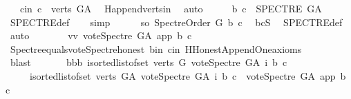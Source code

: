 \begin{isabellebody}
\ \ \ c{\isacharunderscore}{\kern0pt}in{}{\isacharcolon}{\kern0pt}\ {\isachardoublequoteopen}c\ {\isasymin}\ verts\ G{\isacharunderscore}{\kern0pt}A{\isachardoublequoteclose}\ \isamarkupfalse%
\ H{}{\isachardot}{\kern0pt}append{\isacharunderscore}{\kern0pt}verts{\isacharunderscore}{\kern0pt}in\ \isamarkupfalse%
\ auto\isanewline
\ \ \isamarkupfalse%
\ \isamarkupfalse%
\ {\isachardoublequoteopen}{\isacharparenleft}{\kern0pt}b{\isacharcomma}{\kern0pt}\ c{\isacharparenright}{\kern0pt}\ {\isasymin}\ SPECTRE\ G{\isacharunderscore}{\kern0pt}A{\isachardoublequoteclose}\isanewline
\ \ \ \ \isamarkupfalse%
\ SPECTRE{\isacharunderscore}{\kern0pt}def\ \isanewline
\ \ \isamarkupfalse%
{\isacharparenleft}{\kern0pt}simp{\isacharparenright}{\kern0pt}\isanewline
\ \ \ \ \isamarkupfalse%
\ so{\isacharcolon}{\kern0pt}\ {\isachardoublequoteopen}Spectre{\isacharunderscore}{\kern0pt}Order\ G\ b\ c{\isachardoublequoteclose}\ \isamarkupfalse%
\ bcS\ \isamarkupfalse%
\ SPECTRE{\isacharunderscore}{\kern0pt}def\ \isamarkupfalse%
\ auto\isanewline
\ \ \ \ \isamarkupfalse%
\ \isamarkupfalse%
\ vv{\isacharcolon}{\kern0pt}\ {\isachardoublequoteopen}vote{\isacharunderscore}{\kern0pt}Spectre\ G{\isacharunderscore}{\kern0pt}A\ app\ b\ c\ {\isacharequal}{\kern0pt}\ {}{\isachardoublequoteclose}\isanewline
\ \ \ \ \ \ \isamarkupfalse%
\ Spectre{\isacharunderscore}{\kern0pt}equals{\isacharunderscore}{\kern0pt}vote{\isacharunderscore}{\kern0pt}Spectre{\isacharunderscore}{\kern0pt}honest\ b{\isacharunderscore}{\kern0pt}in\ c{\isacharunderscore}{\kern0pt}in\ H{}{\isachardot}{\kern0pt}Honest{\isacharunderscore}{\kern0pt}Append{\isacharunderscore}{\kern0pt}One{\isacharunderscore}{\kern0pt}axioms\isanewline
\ \ \ \ \ \ \isamarkupfalse%
\ blast\ \isanewline
\ \ \ \ \isamarkupfalse%
\ bbb{\isacharcolon}{\kern0pt}\ {\isachardoublequoteopen}{\isacharparenleft}{\kern0pt}{\isasymSum}i{\isasymleftarrow}sorted{\isacharunderscore}{\kern0pt}list{\isacharunderscore}{\kern0pt}of{\isacharunderscore}{\kern0pt}set\ {\isacharparenleft}{\kern0pt}verts\ G{\isacharparenright}{\kern0pt}{\isachardot}{\kern0pt}\ vote{\isacharunderscore}{\kern0pt}Spectre\ G{\isacharunderscore}{\kern0pt}A\ i\ b\ c{\isacharparenright}{\kern0pt}\ {\isacharequal}{\kern0pt}\isanewline
\ \ \ \ \ {\isacharparenleft}{\kern0pt}{\isasymSum}i{\isasymleftarrow}sorted{\isacharunderscore}{\kern0pt}list{\isacharunderscore}{\kern0pt}of{\isacharunderscore}{\kern0pt}set\ {\isacharparenleft}{\kern0pt}verts\ G{\isacharunderscore}{\kern0pt}A{\isacharparenright}{\kern0pt}{\isachardot}{\kern0pt}\ vote{\isacharunderscore}{\kern0pt}Spectre\ G{\isacharunderscore}{\kern0pt}A\ i\ b\ c{\isacharparenright}{\kern0pt}\ {\isacharminus}{\kern0pt}\ vote{\isacharunderscore}{\kern0pt}Spectre\ G{\isacharunderscore}{\kern0pt}A\ app\ b\ c{\isachardoublequoteclose}\isanewline

\end{isabellebody}
